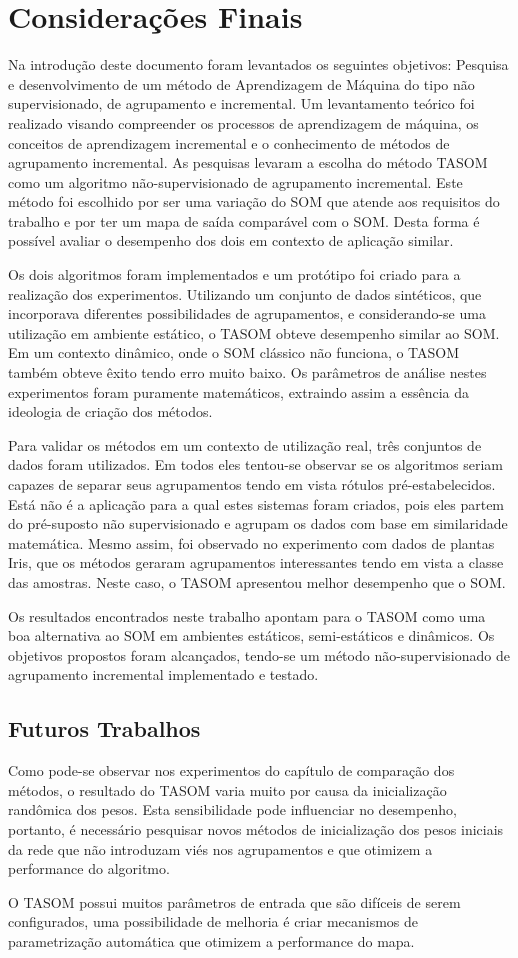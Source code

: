 \chapter{Considerações Finais}
Na introdução deste documento foram levantados os seguintes objetivos: Pesquisa e desenvolvimento de um método de Aprendizagem de Máquina do tipo não supervisionado, de agrupamento e incremental. Um levantamento teórico foi realizado visando compreender os processos de aprendizagem de máquina, os conceitos de aprendizagem incremental e o conhecimento de métodos de agrupamento incremental. As pesquisas levaram a escolha do método TASOM como um algoritmo não-supervisionado de agrupamento incremental. Este método foi escolhido por ser uma variação do SOM que atende aos requisitos do trabalho e por ter um mapa de saída comparável com o SOM. Desta forma é possível avaliar o desempenho dos dois em contexto de aplicação similar.

Os dois algoritmos foram implementados e um protótipo foi criado para a realização dos experimentos. Utilizando um conjunto de dados sintéticos, que incorporava diferentes possibilidades de agrupamentos, e considerando-se uma utilização em ambiente estático, o TASOM obteve desempenho similar ao SOM. Em um contexto dinâmico, onde o SOM clássico não funciona, o TASOM também obteve êxito tendo erro muito baixo. Os parâmetros de análise nestes experimentos foram puramente matemáticos, extraindo assim a essência da ideologia de criação dos métodos.

Para validar os métodos em um contexto de utilização real, três conjuntos de dados foram utilizados. Em todos eles tentou-se observar se os algoritmos seriam capazes de separar seus agrupamentos tendo em vista rótulos pré-estabelecidos. Está não é a aplicação para a qual estes sistemas foram criados, pois eles partem do pré-suposto não supervisionado e agrupam os dados com base em similaridade matemática. Mesmo assim, foi observado no experimento com dados de plantas Iris, que os métodos geraram agrupamentos interessantes tendo em vista a classe das amostras. Neste caso, o TASOM apresentou melhor desempenho que o SOM. 

Os resultados encontrados neste trabalho apontam para o TASOM como uma boa alternativa ao SOM em ambientes estáticos, semi-estáticos e dinâmicos. Os objetivos propostos foram alcançados, tendo-se um método não-supervisionado de agrupamento incremental implementado e testado.

\section{Futuros Trabalhos}
Como pode-se observar nos experimentos do capítulo de comparação dos métodos, o resultado do TASOM varia muito por causa da inicialização randômica dos pesos. Esta sensibilidade pode influenciar no desempenho, portanto, é necessário pesquisar novos métodos de inicialização dos pesos iniciais da rede que não introduzam viés nos agrupamentos e que otimizem a performance do algoritmo.

O TASOM possui muitos parâmetros de entrada que são difíceis de serem configurados, uma possibilidade de melhoria é criar mecanismos de parametrização automática que otimizem a performance do mapa.    

   
